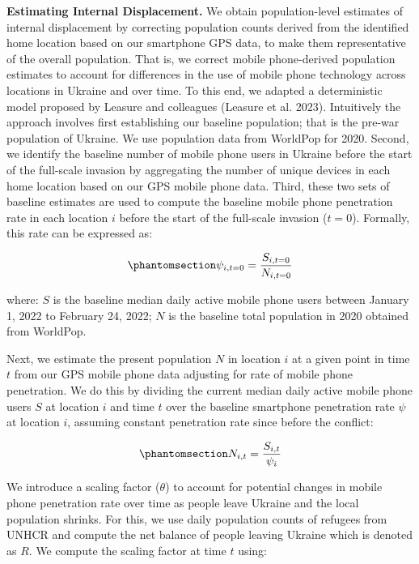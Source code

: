 \documentclass[
  sn-nature,
  11pt,
]{sn-jnl}
\begin{document}
\textbf{Estimating Internal Displacement.} We obtain population-level
estimates of internal displacement by correcting population counts
derived from the identified home location based on our smartphone GPS
data, to make them representative of the overall population. That is, we
correct mobile phone-derived population estimates to account for
differences in the use of mobile phone technology across locations in
Ukraine and over time. To this end, we adapted a deterministic model
proposed by Leasure and colleagues (Leasure et al. 2023). Intuitively
the approach involves first establishing our baseline population; that
is the pre-war population of Ukraine. We use population data from
WorldPop for 2020. Second, we identify the baseline number of mobile
phone users in Ukraine before the start of the full-scale invasion by
aggregating the number of unique devices in each home location based on
our GPS mobile phone data. Third, these two sets of baseline estimates
are used to compute the baseline mobile phone penetration rate in each
location \(i\) before the start of the full-scale invasion (\(t=0\)).
Formally, this rate can be expressed as:

\begin{equation}\phantomsection\label{eq-equation1}{ \psi_{i,t=0} = \frac {S_{i,t=0}} {N_{i,t=0}}}\end{equation}

where: \(S\) is the baseline median daily active mobile phone users
between January 1, 2022 to February 24, 2022; \(N\) is the baseline
total population in 2020 obtained from WorldPop.

Next, we estimate the present population \(N\) in location \(i\) at a
given point in time \(t\) from our GPS mobile phone data adjusting for
rate of mobile phone penetration. We do this by dividing the current
median daily active mobile phone users \(S\) at location \(i\) and time
\(t\) over the baseline smartphone penetration rate \(\psi\) at location
\(i\), assuming constant penetration rate since before the conflict:

\begin{equation}\phantomsection\label{eq-equation2}{ N_{i,t} = \frac {S_{i,t}} {\psi_{i}} }\end{equation}

We introduce a scaling factor (\(\theta\)) to account for potential
changes in mobile phone penetration rate over time as people leave
Ukraine and the local population shrinks. For this, we use daily
population counts of refugees from UNHCR and compute the net balance of
people leaving Ukraine which is denoted as \(R\). We compute the scaling
factor at time \(t\) using:
\end{document}
